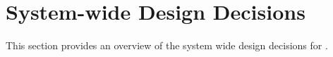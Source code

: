 
\chapter{System-wide Design Decisions}
\label{loc:SystemWideDesignDecisions}


This section provides an overview of the system wide design decisions for \ThisSys.
